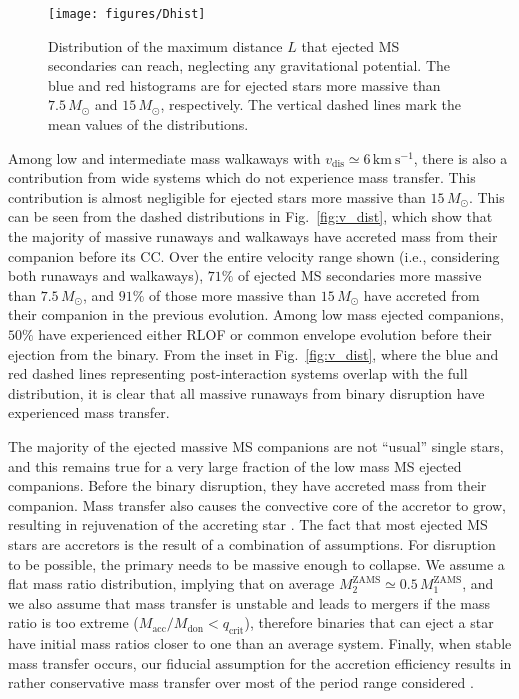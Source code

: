\documentclass{aa}
\DeclareRobustCommand{\Figref}[1]{Fig.~\ref{#1}}
\begin{document}
\begin{figure}[tbp]
  \centering
  \texttt{[image: figures/Dhist]}
  \caption{Distribution of the maximum distance $L$ that ejected
    MS secondaries can reach, neglecting any gravitational
    potential. The blue and red histograms are for ejected stars more
    massive than $7.5\,M_\odot$ and $15\,M_\odot$, respectively. The
    vertical dashed lines mark the mean values of
    the distributions.}
  \label{fig:Dhist}
\end{figure}


Among low and intermediate mass walkaways with
$v_\mathrm{dis}\simeq6\,\mathrm{km\ s^{-1}}$, there is also a contribution from
wide systems which do not experience mass transfer. This contribution
is almost negligible for ejected stars more massive than
$15\,M_\odot$. This can be seen from the dashed distributions in
\Figref{fig:v_dist}, which show that the majority
of massive runaways and walkaways have accreted mass from
their companion before its CC. Over the entire velocity range shown
(i.e., considering both runaways and walkaways), $71\%$ of ejected MS
secondaries more massive than $7.5\,M_\odot$, and $91\%$ of those more
massive than $15\,M_\odot$ have accreted from their companion in
the previous evolution. Among low mass ejected companions, $50\%$ have
experienced either RLOF or common envelope evolution before their
ejection from the binary. From the inset in \Figref{fig:v_dist}, where
the blue and red dashed lines representing post-interaction systems
overlap with the full distribution, it is clear that all massive
runaways from binary disruption have experienced mass transfer. 

The majority of the ejected massive MS
companions are not ``usual'' single stars, and this remains true for a
very large fraction of the low mass MS ejected companions. Before the binary disruption,
they have accreted mass from their companion. Mass transfer also causes the convective core of the accretor to grow,
resulting in rejuvenation of the accreting star
\citep[e.g.,][]{hellings:83,schneider:16}. The fact that most ejected
MS stars are accretors is the result of a
combination of assumptions. For disruption to be possible,
the primary needs to be massive enough to collapse. We assume a flat
mass ratio distribution, implying that on average $M_2^\mathrm{ZAMS}\simeq
0.5\,M_1^\mathrm{ZAMS}$, and we also assume that mass transfer is
unstable and leads to mergers if the mass ratio is too extreme
($M_\mathrm{acc}/M_\mathrm{don}<q_\mathrm{crit}$), therefore binaries
that can eject a star have initial mass ratios closer to one than an
average system. Finally, when stable mass transfer occurs, our fiducial
assumption for the accretion efficiency results in rather conservative
mass transfer over most of the period range considered
\citep[][]{schneider:15}.
\end{document}
